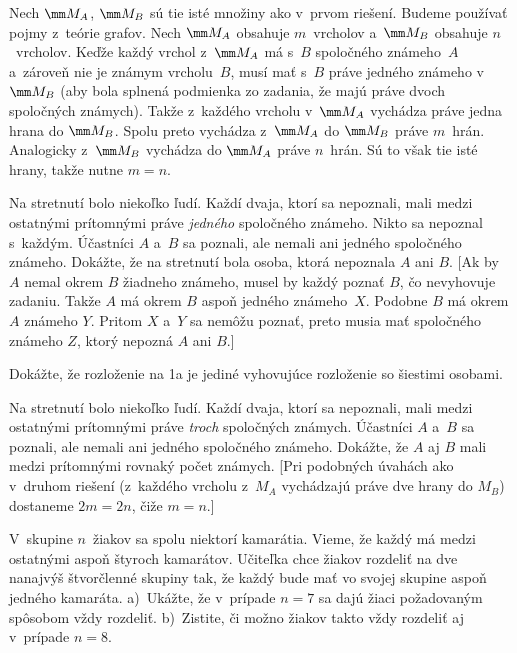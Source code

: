 {\ineriesenie
Nech $\mm M_A$, $\mm M_B$ sú tie isté množiny ako v~prvom riešení. Budeme používať pojmy z~teórie grafov. Nech $\mm M_A$ obsahuje $m$~vrcholov a~$\mm M_B$ obsahuje $n$~vrcholov. Keďže každý vrchol z~$\mm M_A$ má s~$B$ spoločného známeho~$A$ a~zároveň nie je známym vrcholu~$B$, musí mať s~$B$ práve jedného známeho v~$\mm M_B$ (aby bola splnená podmienka zo zadania, že majú práve dvoch spoločných známych). Takže z~každého vrcholu v~$\mm M_A$ vychádza práve jedna hrana do $\mm M_B$. Spolu preto vychádza z~$\mm M_A$ do $\mm M_B$ práve $m$~hrán. Analogicky z~$\mm M_B$ vychádza do $\mm M_A$ práve $n$~hrán. Sú to však tie isté hrany, takže nutne $m=n$.

Na stretnutí bolo niekoľko ľudí. Každí dvaja, ktorí sa nepoznali, mali medzi
ostatnými prítomnými práve {\it jedného\/} spoločného známeho. Nikto sa nepoznal s~každým. Účastníci $A$ a~$B$ sa
poznali, ale nemali ani jedného spoločného známeho. Dokážte, že na stretnutí bola osoba, ktorá nepoznala $A$ ani $B$.
[Ak by $A$ nemal okrem $B$ žiadneho známeho, musel by každý poznať $B$, čo nevyhovuje zadaniu. Takže $A$ má okrem $B$ aspoň jedného známeho~$X$. Podobne $B$ má okrem $A$ známeho $Y$. Pritom $X$ a~$Y$ sa nemôžu poznať, preto musia mať spoločného známeho $Z$, ktorý nepozná $A$ ani $B$.]

\D
Dokážte, že rozloženie na \obrr1a je jediné vyhovujúce rozloženie so šiestimi osobami.

Na stretnutí bolo niekoľko ľudí. Každí dvaja, ktorí sa nepoznali, mali medzi
ostatnými prítomnými práve {\it troch\/} spoločných známych. Účastníci $A$ a~$B$ sa
poznali, ale nemali ani jedného spoločného známeho. Dokážte, že $A$ aj $B$
mali medzi prítomnými rovnaký počet známych. [Pri podobných úvahách ako v~druhom riešení (z~každého vrcholu z~$M_A$ vychádzajú práve dve hrany do $M_B$) dostaneme $2m=2n$, čiže $m=n$.]

V~skupine $n$~žiakov sa spolu niektorí kamarátia. Vieme, že každý má medzi ostatnými
aspoň štyroch kamarátov. Učiteľka chce žiakov rozdeliť na dve nanajvýš štvorčlenné skupiny
tak, že každý bude mať vo svojej skupine aspoň jedného kamaráta. a)~Ukážte, že v~prípade $n = 7$ sa dajú žiaci požadovaným spôsobom vždy rozdeliť. b)~Zistite, či možno žiakov takto vždy rozdeliť aj v~prípade $n = 8$.
\vpravo{[60--C--I--4]}
}


